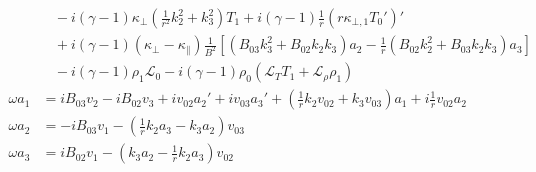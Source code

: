 \documentclass[11pt, fleqn]{article}
\newcommand{\HL}{\mathscr{L}}
\begin{document}
\begin{equation}
\begin{aligned}
					      &~~~~ - i(\gamma - 1)\kappa_\bot\left(\frac{1}{r^2}k_2^2 + k_3^2\right)T_1 + i(\gamma - 1)\frac{1}{r}(r\kappa_{\bot, 1}T_0')'																					\\
						  &~~~~ + i(\gamma - 1)(\kappa_\bot - \kappa_\parallel)\frac{1}{B^2}\left[(B_{03}k_3^2 + B_{02}k_2k_3)a_2 - \frac{1}{r}(B_{02}k_2^2 + B_{03}k_2k_3)a_3\right]													\\
						  &~~~~ - i(\gamma - 1)\rho_1\HL_0 - i(\gamma - 1)\rho_0(\HL_T T_1 + \HL_\rho \rho_1)																															\\[8pt]
		\omega a_1		  &= iB_{03}v_2 - iB_{02}v_3 + iv_{02}a_2' + iv_{03}a_3' + \left(\frac{1}{r}k_2v_{02} + k_3v_{03}\right)a_1 + i\frac{1}{r}v_{02}a_2																				\\[8pt]
		\omega a_2		  &= -iB_{03}v_1 - \left(\frac{1}{r}k_2a_3 - k_3a_2\right)v_{03}																																				\\[8pt]
		\omega a_3		  &=  iB_{02}v_1 - \left(k_3a_2 - \frac{1}{r}k_2a_3\right)v_{02}
	\end{aligned}
\end{equation}

\newpage
\end{document}
